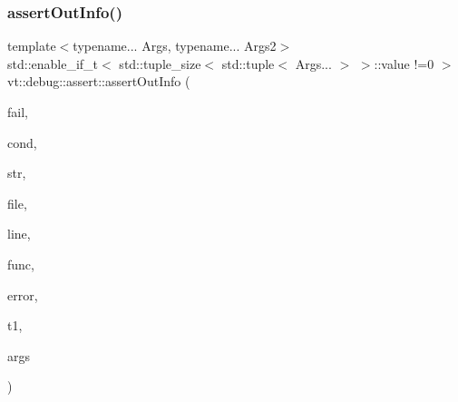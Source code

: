 \subsubsection{\texorpdfstring{assert\+Out\+Info()}{assertOutInfo()}\hspace{0.1cm}{\footnotesize\ttfamily [2/2]}}
{\footnotesize\ttfamily template$<$typename... Args, typename... Args2$>$ \\
std\+::enable\+\_\+if\+\_\+t$<$ std\+::tuple\+\_\+size$<$ std\+::tuple$<$ Args... $>$ $>$\+::value !=0 $>$ vt\+::debug\+::assert\+::assert\+Out\+Info (\begin{DoxyParamCaption}\item[{bool}]{fail,  }\item[{std\+::string const}]{cond,  }\item[{std\+::string const \&}]{str,  }\item[{std\+::string const \&}]{file,  }\item[{int const}]{line,  }\item[{std\+::string const \&}]{func,  }\item[{\hyperlink{namespacevt_a793764d753923abc3d32929870beb485}{Error\+Code\+Type}}]{error,  }\item[{std\+::tuple$<$ Args2... $>$ \&\&}]{t1,  }\item[{std\+::tuple$<$ Args... $>$ \&\&}]{args }\end{DoxyParamCaption})\hspace{0.3cm}{\ttfamily [inline]}}

